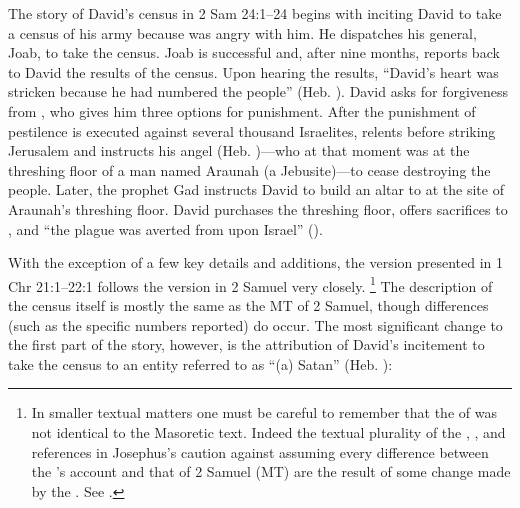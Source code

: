 The story of David's census in 2 Sam 24:1--24 begins with \yahweh inciting David to take a census of his army because \yahweh was angry with him. He dispatches his general, Joab, to take the census. Joab is successful and, after nine months, reports back to David the results of the census. Upon hearing the results, ``David's heart was stricken because he had numbered the people'' (Heb. ). David asks for forgiveness from \yahweh, who gives him three options for punishment. After the punishment of pestilence is executed against several thousand Israelites, \yahweh relents before striking Jerusalem and instructs his angel (Heb. )---who at that moment was at the threshing floor of a man named Araunah (a Jebusite)---to cease destroying the people. Later, the prophet Gad instructs David to build an altar to \yahweh at the site of Araunah's threshing floor. David purchases the threshing floor, offers sacrifices to \yahweh, and ``the plague was averted from upon Israel'' ().

With the exception of a few key details and additions, the version presented in 1 Chr 21:1--22:1 follows the version in 2 Samuel very closely.%
    \footnote{In smaller textual matters one must be careful to remember that the \vorlage of \chronicles was not identical to the Masoretic text. Indeed the textual plurality of the \lxx, , and references in Josephus's \ant caution against assuming every difference between the \chronicler's account and that of 2 Samuel (MT) are the result of some change made by the \chronicler. See \cite[761--762]{knoppers2007}.}
The description of the census itself is mostly the same as the MT of 2 Samuel, though differences (such as the specific numbers reported) do occur. The most significant change to the first part of the story, however, is the attribution of David's incitement to take the census to an entity referred to as ``(a) Satan'' (Heb. ):

